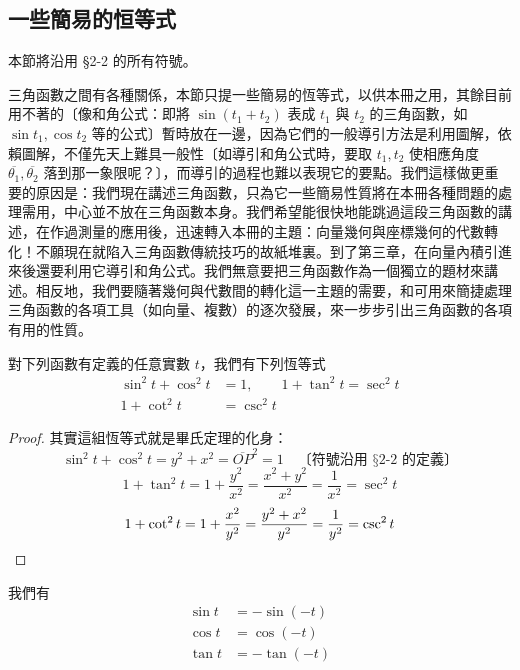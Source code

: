 \subsection{一些簡易的恒等式}
\label{subsec:b3-2-3}

本節將沿用 §2-2 的所有符號。

三角函數之間有各種關係，本節只提一些簡易的恆等式，以供本冊之用，其餘目前用不著的〔像和角公式：即將 $\sin(t_1 + t_2)$ 表成 $t_1$ 與 $t_2$ 的三角函數，如 $\sin t_1, \cos t_2$ 等的公式〕暫時放在一邊，因為它們的一般導引方法是利用圖解，依賴圖解，不僅先天上難具一般性〔如導引和角公式時，要取 $t_1, t_2$ 使相應角度 $\overline{\theta_1}, \overline{\theta_2}$ 落到那一象限呢？〕，而導引的過程也難以表現它的要點。我們這樣做更重要的原因是：我們現在講述三角函數，只為它一些簡易性質將在本冊各種問題的處理需用，中心並不放在三角函數本身。我們希望能很快地能跳過這段三角函數的講述，在作過測量的應用後，迅速轉入本冊的主題：向量幾何與座標幾何的代數轉化！不願現在就陷入三角函數傳統技巧的故紙堆裏。到了第三章，在向量內積引進來後還要利用它導引和角公式。我們無意要把三角函數作為一個獨立的題材來講述。相反地，我們要隨著幾何與代數間的轉化這一主題的需要，和可用來簡捷處理三角函數的各項工具（如向量、複數）的逐次發展，來一步步引出三角函數的各項有用的性質。

\begin{proposition}
對下列函數有定義的任意實數 $t$，我們有下列恆等式
\begin{align*}
\sin^2 t + \cos^2 t &= 1,\qquad 1 + \tan^2 t = \sec^2 t \\
1 + \cot^2 t &= \csc^2 t
\end{align*}
\end{proposition}

\begin{proof}
其實這組恆等式就是畢氏定理的化身：
\[ \sin^2 t + \cos^2 t = y^2 + x^2 = \overline{OP}^2 = 1 \quad\text{〔符號沿用 §2-2 的定義〕} \]
\[ 1 + \tan^2 t = 1 + \frac{y^2}{x^2} = \frac{x^2 + y^2}{x^2} = \frac{1}{x^2} = \sec^2 t \]
\[ 1 + \cot^2 t = 1 + \frac{x^2}{y^2} = \frac{y^2 + x^2}{y^2} = \frac{1}{y^2} = \csc^2 t \qedhere \]
\end{proof}

\begin{proposition}[負角公式]
我們有
\begin{align*}
\sin t &= -\sin(-t) \\
\cos t &= \cos(-t) \\
\tan t &= -\tan(-t)
\end{align*}
\end{proposition}

